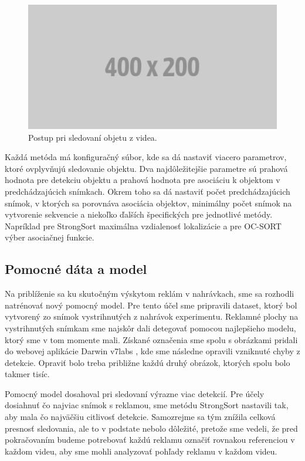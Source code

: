  \begin{figure}[ht]
     \centering
     \includegraphics[width=1\textwidth]{images/02/placeholder.png}
     \caption{Postup pri sledovaní objetu z videa.}
     \label{img:tracking}
 \end{figure}

Každá metóda má konfiguračný súbor, kde sa dá nastaviť viacero parametrov, ktoré ovplyvňujú sledovanie objektu. Dva najdôležitejšie parametre sú prahová hodnota pre detekciu objektu a prahová hodnota pre asociáciu k objektom v predchádzajúcich snímkach. Okrem toho sa dá nastaviť počet predchádzajúcich snímok, v ktorých sa porovnáva asociácia objektov, minimálny počet snímok na vytvorenie sekvencie a niekoľko ďalších špecifických pre jednotlivé metódy. Napríklad pre StrongSort maximálna vzdialenosť lokalizácie a pre OC-SORT výber asociačnej funkcie.

\subsection{Pomocné dáta a model}

Na priblíženie sa ku skutočným výskytom reklám v nahrávkach, sme sa rozhodli natrénovať nový pomocný model. Pre tento účel sme pripravili dataset, ktorý bol vytvorený zo snímok vystrihnutých z nahrávok experimentu. Reklamné plochy na vystrihnutých snímkam sme najskôr dali detegovať pomocou najlepšieho modelu, ktorý sme v tom momente mali. Získané označenia sme spolu s obrázkami pridali do webovej aplikácie Darwin v7labs \cite{v7}, kde sme následne opravili vzniknuté chyby z detekcie. Opraviť bolo treba približne každú druhý obrázok, ktorých spolu bolo takmer tisíc.

Pomocný model dosahoval pri sledovaní výrazne viac detekcií. Pre účely dosiahnuť čo najviac snímok s reklamou, sme metódu StrongSort nastavili tak, aby mala čo najväčšiu citlivosť detekcie. Samozrejme sa tým znížila celková presnosť sledovania, ale to v podstate nebolo dôležité, pretože sme vedeli, že pred pokračovaním budeme potrebovať každú reklamu označiť rovnakou referenciou v každom videu, aby sme mohli analyzovať pohľady reklamu v každom videu.

